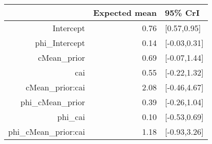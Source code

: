 \begin{tabular}{rrl}
  \hline
 & Expected mean & 95\% CrI \\ 
  \hline
Intercept & 0.76 & [0.57,0.95] \\ 
  phi\_Intercept & 0.14 & [-0.03,0.31] \\ 
  cMean\_prior & 0.69 & [-0.07,1.44] \\ 
  cai & 0.55 & [-0.22,1.32] \\ 
  cMean\_prior:cai & 2.08 & [-0.46,4.67] \\ 
  phi\_cMean\_prior & 0.39 & [-0.26,1.04] \\ 
  phi\_cai & 0.10 & [-0.53,0.69] \\ 
  phi\_cMean\_prior:cai & 1.18 & [-0.93,3.26] \\ 
   \hline
\end{tabular}

